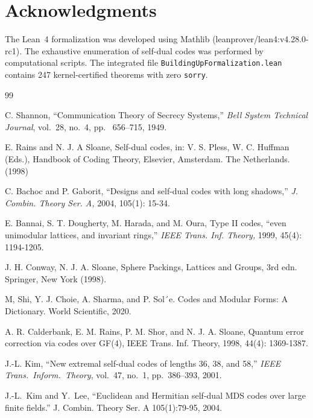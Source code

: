 \documentclass[12pt]{article}
\begin{document}
\section*{Acknowledgments}

The Lean~4 formalization was developed using Mathlib (leanprover/lean4:v4.28.0-rc1). The exhaustive enumeration of self-dual codes was performed by computational scripts. The integrated file \texttt{BuildingUpFormalization.lean} contains 247 kernel-certified theorems with zero \texttt{sorry}.



\begin{thebibliography}{99}

C. Shannon, ``Communication Theory of Secrecy Systems,'' \textit{Bell System Technical Journal}, vol.~28, no.~4, pp.~ 656--715, 1949.

 E. Rains and N. J. A Sloane, Self-dual codes, in: V. S. Pless, W. C. Huffman (Eds.),
Handbook of Coding Theory, Elsevier, Amsterdam. The Netherlands. (1998)


 C. Bachoc and P. Gaborit, ``Designs and self-dual codes with long shadows,'' \textit{J. Combin.
Theory Ser. A,} 2004, 105(1): 15-34.

 E. Bannai, S. T. Dougherty, M. Harada, and M. Oura, Type II codes, ``even unimodular
lattices, and invariant rings,'' \textit{IEEE Trans. Inf. Theory,} 1999, 45(4): 1194-1205.

J. H. Conway, N. J. A. Sloane, Sphere Packings, Lattices and Groups, 3rd edn.
Springer, New York (1998).

 M, Shi, Y. J. Choie, A. Sharma, and P. Sol´e. Codes and Modular Forms: A Dictionary. World Scientific, 2020.

A. R. Calderbank, E. M. Rains, P. M. Shor, and N. J. A. Sloane, Quantum error
correction via codes over GF(4), IEEE Trans. Inf. Theory, 1998, 44(4): 1369-1387.


J.-L. Kim,
``New extremal self-dual codes of lengths 36, 38, and 58,''
\textit{IEEE Trans.\ Inform.\ Theory}, vol.~47, no.~1, pp.~386--393, 2001.

J.-L.~Kim and Y.~Lee, ``Euclidean and Hermitian self-dual MDS codes over large finite fields.'' J. Combin. Theory Ser. A 105(1):79-95, 2004.



\end{thebibliography}
\end{document}
